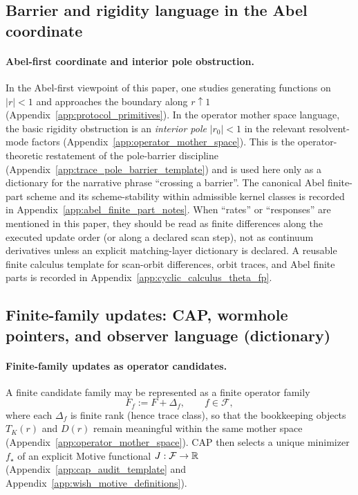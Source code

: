 \subsection{Barrier and rigidity language in the Abel coordinate}
\label{subsec:operator_mother_space_dictionary_barrier}

\paragraph{Abel-first coordinate and interior pole obstruction.}
\InterfaceTag In the Abel-first viewpoint of this paper, one studies generating functions on $|r|<1$ and approaches the boundary along $r\uparrow 1$ (Appendix~\ref{app:protocol_primitives}).
In the operator mother space language, the basic rigidity obstruction is an \emph{interior pole} $|r_0|<1$ in the relevant resolvent-mode factors (Appendix~\ref{app:operator_mother_space}).
\AuditTag This is the operator-theoretic restatement of the pole-barrier discipline (Appendix~\ref{app:trace_pole_barrier_template}) and is used here only as a dictionary for the narrative phrase ``crossing a barrier''.
\AuditTag The canonical Abel finite-part scheme and its scheme-stability within admissible kernel classes is recorded in Appendix~\ref{app:abel_finite_part_notes}.
\AuditTag When ``rates'' or ``responses'' are mentioned in this paper, they should be read as finite differences along the executed update order (or along a declared scan step), not as continuum derivatives unless an explicit matching-layer dictionary is declared.
A reusable finite calculus template for scan-orbit differences, orbit traces, and Abel finite parts is recorded in Appendix~\ref{app:cyclic_calculus_theta_fp}.

\subsection{Finite-family updates: CAP, wormhole pointers, and observer language (dictionary)}
\label{subsec:operator_mother_space_dictionary_updates}

\paragraph{Finite-family updates as operator candidates.}
\InterfaceTag A finite candidate family may be represented as a finite operator family
\[
F_f:=F+\Delta_f,
\qquad f\in\mathcal{F},
\]
where each $\Delta_f$ is finite rank (hence trace class), so that the bookkeeping objects $T_K(r)$ and $D(r)$ remain meaningful within the same mother space (Appendix~\ref{app:operator_mother_space}).
CAP then selects a unique minimizer $f_\star$ of an explicit Motive functional $J:\mathcal{F}\to\mathbb{R}$ (Appendix~\ref{app:cap_audit_template} and Appendix~\ref{app:wish_motive_definitions}).

